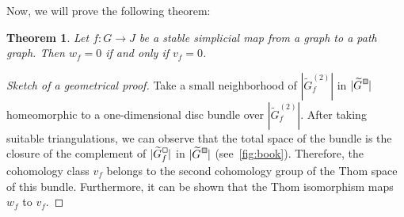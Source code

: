 \documentclass[a4paper,12pt,reqno,oneside]{amsart}
\theoremstyle{plain}
\newtheorem{theorem}{Theorem}
\theoremstyle{definition}
\theoremstyle{plain}
\newcommand{\from}{\colon}
\newcommand{\wt}[1]{\widetilde{#1}}
\newcommand{\gbox}{\tikz{\node[shape=rectangle,fill=black!20,draw,inner sep=0.7mm,align=center] (char) {};}}
\newcommand{\wbox}{\tikz{\node[shape=rectangle,draw,inner sep=0.7mm,align=center] (char) {};}}
\newcommand*\wGc{\wt{G}^{\hspace{1pt}\raisebox{0.8pt}{\gbox}}}
\newcommand*\wGcf{\wt{G}^{\hspace{1pt}\raisebox{0.8pt}{\wbox}}_{f}}
\begin{document}
Now, we will prove the following theorem:

\begin{theorem}\label{thm:cohomology_equivalence}
  Let $f \from G \to J$ be a stable simplicial map from a graph to a path graph. Then $w_f = 0$ if
  and only if $v_f = 0$.
\end{theorem}

\begin{proof}[Sketch of a geometrical proof]
  Take a small neighborhood of $|\wt{G}^{(2)}_f|$ in $|\wGc|$ homeomorphic to a one-dimensional disc
  bundle over $|\wt{G}^{(2)}_f|$. After taking suitable triangulations, we can observe that the
  total space of the bundle is the closure of the complement of $|\wGcf|$ in $|\wGc|$
  (see~\cref{fig:book}). Therefore, the cohomology class $v_f$ belongs to the second cohomology
  group of the Thom space of this bundle. Furthermore, it can be shown that the Thom isomorphism
  maps $w_f$ to $v_f$.
\end{proof}
\end{document}
